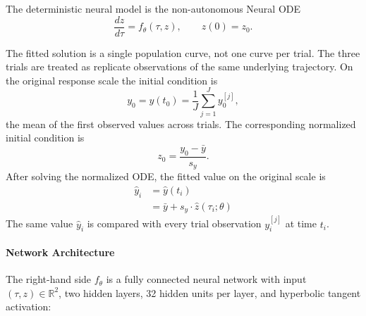The deterministic neural model is the non-autonomous Neural ODE
\citep{chen2018neuralode}
\begin{equation}
  \frac{d z}{d\tau} = f_\theta(\tau,z),
  \qquad
  z(0)=z_0.
\end{equation}

The fitted solution is a single population curve, not one curve per trial. The
three trials are treated as replicate observations of the same underlying
trajectory. On the original response scale the initial condition is
\begin{equation}
    y_0 = y(t_0)
    =
        \frac{1}{J}\sum_{j=1}^J y_0^{[j]},
\end{equation}
%
the mean of the first observed values across trials. The corresponding
normalized initial condition is
$$
    z_0 = \frac{y_0-\bar y}{s_y}.
$$
After solving the normalized ODE, the fitted value on the original scale is
\begin{equation}
    \label{eqn:inverze_normalization}
    \begin{aligned}
        \widehat y_i
            &=
                \widehat y(t_i)
        \\
            &=
            \bar y +
            s_y \cdot \widehat z(\tau_i;\theta)
    \end{aligned}
\end{equation}
The same value $\widehat y_i$ is compared with every trial observation
$y_i^{[j]}$ at time $t_i$.

\paragraph{Network Architecture}
The right-hand side $f_\theta$ is a fully connected neural network with input
$(\tau,z)\in\mathbb R^2$, two hidden layers, 32 hidden units per layer, and
hyperbolic tangent activation:

